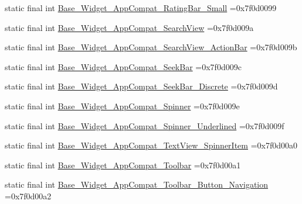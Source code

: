 \begin{DoxyCompactItemize}
\item 
static final int \mbox{\hyperlink{classcom_1_1example_1_1trainawearapplication_1_1_r_1_1style_ade8d70a29a05487e56cd0b35de2043ab}{Base\+\_\+\+Widget\+\_\+\+App\+Compat\+\_\+\+Rating\+Bar\+\_\+\+Small}} =0x7f0d0099
\item 
static final int \mbox{\hyperlink{classcom_1_1example_1_1trainawearapplication_1_1_r_1_1style_a5858f84f319654f7ce4de65dd1927362}{Base\+\_\+\+Widget\+\_\+\+App\+Compat\+\_\+\+Search\+View}} =0x7f0d009a
\item 
static final int \mbox{\hyperlink{classcom_1_1example_1_1trainawearapplication_1_1_r_1_1style_af0985cedf8a4e36926a9c7776681ab56}{Base\+\_\+\+Widget\+\_\+\+App\+Compat\+\_\+\+Search\+View\+\_\+\+Action\+Bar}} =0x7f0d009b
\item 
static final int \mbox{\hyperlink{classcom_1_1example_1_1trainawearapplication_1_1_r_1_1style_aab3475ca772199ae758495073d660252}{Base\+\_\+\+Widget\+\_\+\+App\+Compat\+\_\+\+Seek\+Bar}} =0x7f0d009c
\item 
static final int \mbox{\hyperlink{classcom_1_1example_1_1trainawearapplication_1_1_r_1_1style_a309d973ff7ee777aaa35e24c7ccb5531}{Base\+\_\+\+Widget\+\_\+\+App\+Compat\+\_\+\+Seek\+Bar\+\_\+\+Discrete}} =0x7f0d009d
\item 
static final int \mbox{\hyperlink{classcom_1_1example_1_1trainawearapplication_1_1_r_1_1style_a0cf45f47bb70d34f608a22feb79ebf70}{Base\+\_\+\+Widget\+\_\+\+App\+Compat\+\_\+\+Spinner}} =0x7f0d009e
\item 
static final int \mbox{\hyperlink{classcom_1_1example_1_1trainawearapplication_1_1_r_1_1style_a0b6446efd0263b44ec8641ad5c0e4132}{Base\+\_\+\+Widget\+\_\+\+App\+Compat\+\_\+\+Spinner\+\_\+\+Underlined}} =0x7f0d009f
\item 
static final int \mbox{\hyperlink{classcom_1_1example_1_1trainawearapplication_1_1_r_1_1style_a78a91ff5de15b18e976293d9972729a5}{Base\+\_\+\+Widget\+\_\+\+App\+Compat\+\_\+\+Text\+View\+\_\+\+Spinner\+Item}} =0x7f0d00a0
\item 
static final int \mbox{\hyperlink{classcom_1_1example_1_1trainawearapplication_1_1_r_1_1style_a24a91f3dacf47df05dd9692dfd9b2d5b}{Base\+\_\+\+Widget\+\_\+\+App\+Compat\+\_\+\+Toolbar}} =0x7f0d00a1
\item 
static final int \mbox{\hyperlink{classcom_1_1example_1_1trainawearapplication_1_1_r_1_1style_a244738c5ce9ffa38d5df3d2581b6ecdf}{Base\+\_\+\+Widget\+\_\+\+App\+Compat\+\_\+\+Toolbar\+\_\+\+Button\+\_\+\+Navigation}} =0x7f0d00a2
\item 

\end{DoxyCompactItemize}
